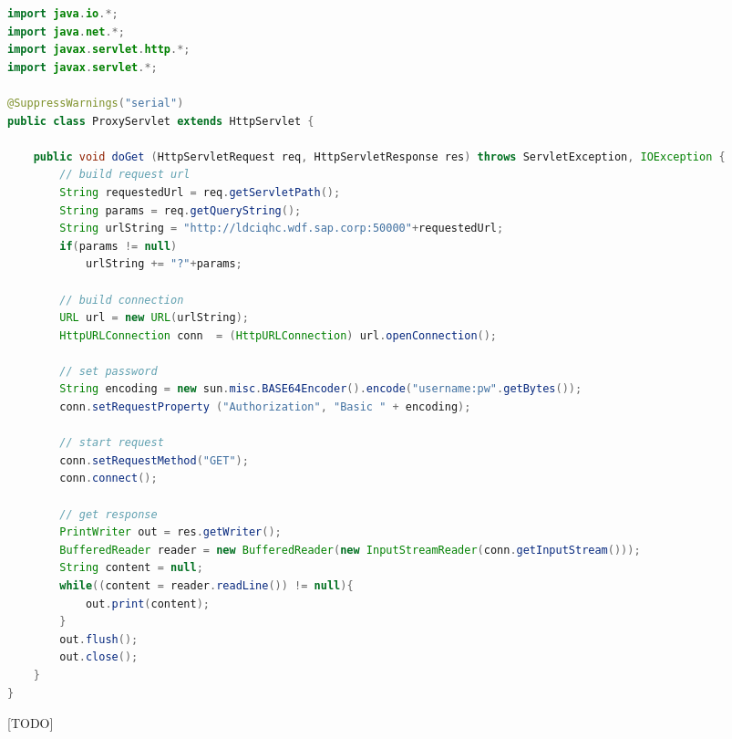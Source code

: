 \begin{programm}[h] %
\begin{lstlisting}[language=Java]
import java.io.*;
import java.net.*;
import javax.servlet.http.*;
import javax.servlet.*;

@SuppressWarnings("serial")
public class ProxyServlet extends HttpServlet {

	public void doGet (HttpServletRequest req, HttpServletResponse res) throws ServletException, IOException {
		// build request url
		String requestedUrl = req.getServletPath();
		String params = req.getQueryString();
		String urlString = "http://ldciqhc.wdf.sap.corp:50000"+requestedUrl;
		if(params != null)
			urlString += "?"+params;
		
		// build connection
		URL url = new URL(urlString);
		HttpURLConnection conn  = (HttpURLConnection) url.openConnection();
		
		// set password
		String encoding = new sun.misc.BASE64Encoder().encode("username:pw".getBytes());
		conn.setRequestProperty ("Authorization", "Basic " + encoding);
		
		// start request
		conn.setRequestMethod("GET");
		conn.connect();
		
		// get response
		PrintWriter out = res.getWriter();
		BufferedReader reader = new BufferedReader(new InputStreamReader(conn.getInputStream()));
		String content = null;
		while((content = reader.readLine()) != null){
			out.print(content);
		}
		out.flush();
		out.close();
	}
}
\end{lstlisting}
\caption{[TODO]\label{[TODO]}}
\end{programm}

\newpage
\sePrintGlossary{}

\sePrintBibliography{}





\seEhrenwoertlicheErklaerung{}


